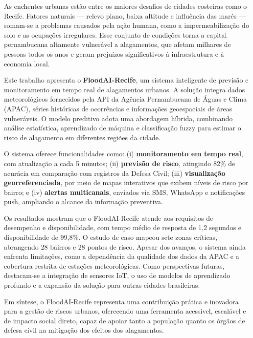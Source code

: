 \begin{resumo}
As enchentes urbanas estão entre os maiores desafios de cidades costeiras como o Recife. Fatores naturais — relevo plano, baixa altitude e influência das marés — somam-se a problemas causados pela ação humana, como a impermeabilização do solo e as ocupações irregulares. Esse conjunto de condições torna a capital pernambucana altamente vulnerável a alagamentos, que afetam milhares de pessoas todos os anos e geram prejuízos significativos à infraestrutura e à economia local.

Este trabalho apresenta o \textbf{FloodAI-Recife}, um sistema inteligente de previsão e monitoramento em tempo real de alagamentos urbanos. A solução integra dados meteorológicos fornecidos pela API da Agência Pernambucana de Águas e Clima (APAC), séries históricas de ocorrências e informações geoespaciais de áreas vulneráveis. O modelo preditivo adota uma abordagem híbrida, combinando análise estatística, aprendizado de máquina e classificação fuzzy para estimar o risco de alagamento em diferentes regiões da cidade.

O sistema oferece funcionalidades como: (i) \textbf{monitoramento em tempo real}, com atualização a cada 5 minutos; (ii) \textbf{previsão de risco}, atingindo 82\% de acurácia em comparação com registros da Defesa Civil; (iii) \textbf{visualização georreferenciada}, por meio de mapas interativos que exibem níveis de risco por bairro; e (iv) \textbf{alertas multicanais}, enviados via SMS, WhatsApp e notificações push, ampliando o alcance da informação preventiva.

Os resultados mostram que o FloodAI-Recife atende aos requisitos de desempenho e disponibilidade, com tempo médio de resposta de 1,2 segundos e disponibilidade de 99,8\%. O estudo de caso mapeou sete zonas críticas, abrangendo 28 bairros e 28 pontos de risco. Apesar dos avanços, o sistema ainda enfrenta limitações, como a dependência da qualidade dos dados da APAC e a cobertura restrita de estações meteorológicas. Como perspectivas futuras, destacam-se a integração de sensores IoT, o uso de modelos de aprendizado profundo e a expansão da solução para outras cidades brasileiras.

Em síntese, o FloodAI-Recife representa uma contribuição prática e inovadora para a gestão de riscos urbanos, oferecendo uma ferramenta acessível, escalável e de impacto social direto, capaz de apoiar tanto a população quanto os órgãos de defesa civil na mitigação dos efeitos dos alagamentos.
\end{resumo}

